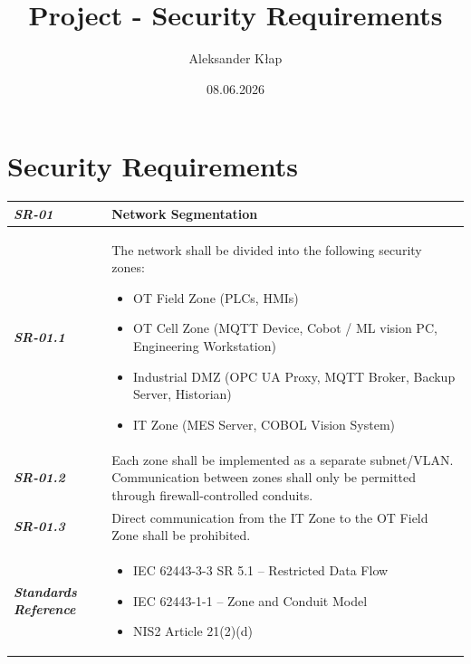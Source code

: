 \documentclass{article}
\title{Project - Security Requirements}
\author{Aleksander Kłap}
\date{08.06.2026}
\begin{document}
\maketitle
\pagebreak

\section{Security Requirements}

\begin{tabularx}{\textwidth}{>{\bfseries}p{2.5cm} X}
    \textit{SR-01} & \textbf{Network Segmentation} \vspace{0.5em}\\
\toprule
\textit{SR-01.1} &
The network shall be divided into the following security zones:
\begin{itemize}[label=-, itemsep=0pt, topsep=2pt]
    \item OT Field Zone (PLCs, HMIs)
    \item OT Cell Zone (MQTT Device, Cobot / ML vision PC, Engineering Workstation)
    \item Industrial DMZ (OPC UA Proxy, MQTT Broker, Backup Server, Historian)
    \item IT Zone (MES Server, COBOL Vision System)
\end{itemize} \vspace{0.5em}
\\
\textit{SR-01.2} &
Each zone shall be implemented as a separate subnet/VLAN.
Communication between zones shall only be permitted through
    firewall-controlled conduits. \vspace{0.5em}
\\
\textit{SR-01.3} &
Direct communication from the IT Zone to the OT Field Zone
    shall be prohibited. \vspace{0.5em}
\\
\midrule
    \textit{Standards Reference} &
\begin{itemize}[label=-, noitemsep, topsep=0pt, leftmargin=*]
    \item IEC 62443-3-3 SR 5.1 -- Restricted Data Flow
    \item IEC 62443-1-1 -- Zone and Conduit Model
    \item NIS2 Article 21(2)(d)
\end{itemize} \vspace{1em} \\ 

\end{tabularx}
\vspace{2em}
\end{document}
